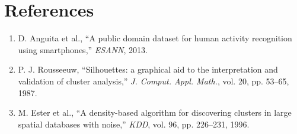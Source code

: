 \documentclass[12pt,a4paper]{article}
\begin{document}
\section*{References}
\begin{enumerate}[noitemsep]
    \item D. Anguita et al., ``A public domain dataset for human activity recognition using smartphones,'' \textit{ESANN}, 2013.
    \item P. J. Rousseeuw, ``Silhouettes: a graphical aid to the interpretation and validation of cluster analysis,'' \textit{J. Comput. Appl. Math.}, vol. 20, pp. 53--65, 1987.
    \item M. Ester et al., ``A density-based algorithm for discovering clusters in large spatial databases with noise,'' \textit{KDD}, vol. 96, pp. 226--231, 1996.
\end{enumerate}
\end{document}
